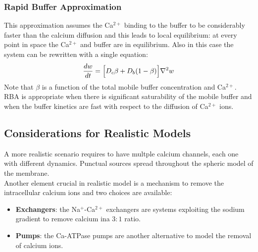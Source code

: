 \subsubsection{Rapid Buffer Approximation}
This approximation assumes the Ca\(^{2+}\) binding to the buffer to be considerably faster than
the calcium diffusion and this leads to local equilibrium: at every point in space the Ca\(^{2+}\)
and buffer are in equilibrium. Also in this case the system can be rewritten with a single equation:
\begin{equation*}
    \frac{dw}{dt}=\Bigl[D_{c}\beta+D_{b}(1-\beta)\Bigr]\nabla^{2}w
\end{equation*}
Note that \(\beta\) is a function of the total mobile buffer concentration and Ca\(^{2+}\).\\
RBA is appropriate when there is significant saturability of the mobile buffer and when the buffer
kinetics are fast with respect to the diffusion of Ca\(^{2+}\) ions.

\subsection{Considerations for Realistic Models}
A more realistic scenario requires to have multple calcium channels, each one with different dynamics.
Punctual sources spread throughout the spheric model of the membrane.\\
Another element crucial in realistic model is a mechanism to remove the intracellular calcium ions and
two choices are available:
\begin{itemize}
    \item \textbf{Exchangers}: the Na\(^{+}\)-Ca\(^{2+}\) exchangers are systems exploiting the sodium
          gradient to remove calcium ina \(3:1\) ratio.
    \item \textbf{Pumps}: the Ca-ATPase pumps are another alternative to model the removal of calcium ions.
\end{itemize}